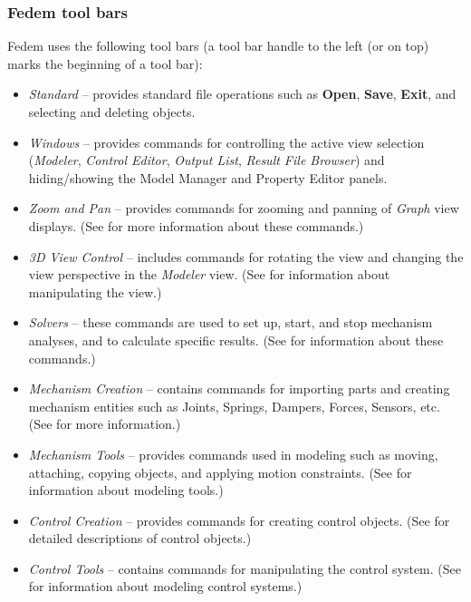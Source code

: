 \subsubsection{Fedem tool bars}

Fedem uses the following tool bars (a tool bar handle to the left (or on
top) marks the beginning of a tool bar):

\begin{itemize}
\item{\sl Standard} --
  provides standard file operations such as \textbf{Open}, \textbf{Save},
  \textbf{Exit}, and selecting and deleting objects.
\item{\sl Windows} --
  provides commands for controlling the active view selection
  ({\sl Modeler}, {\sl Control Editor}, {\sl Output List},
  {\sl Result File Browser})
  and hiding/showing the Model Manager and Property Editor panels.
\item{\sl Zoom and Pan} --
  provides commands for zooming and panning of {\sl Graph} view displays.
  (See  for more information
  about these commands.)
\item{\sl 3D View Control} --
  includes commands for rotating the view and changing the view perspective
  in the {\sl Modeler} view. (See 
  for information about manipulating the view.)
\item{\sl Solvers} --
  these commands are used to set up, start, and stop mechanism analyses,
  and to calculate specific results.
  (See  for information
  about these commands.)
\item{\sl Mechanism Creation} --
  contains commands for importing parts and creating mechanism entities
  such as Joints, Springs, Dampers, Forces, Sensors, etc.
  (See  for more information.)
\item{\sl Mechanism Tools} --
  provides commands used in modeling such as moving, attaching, copying objects,
  and applying motion constraints.
  (See 
  for information about modeling tools.)
\item{\sl Control Creation} --
  provides commands for creating control objects.
  (See 
  for detailed descriptions of control objects.)
\item{\sl Control Tools} --
  contains commands for manipulating the control system.
  (See 
  for information about modeling control systems.)
\end{itemize}

